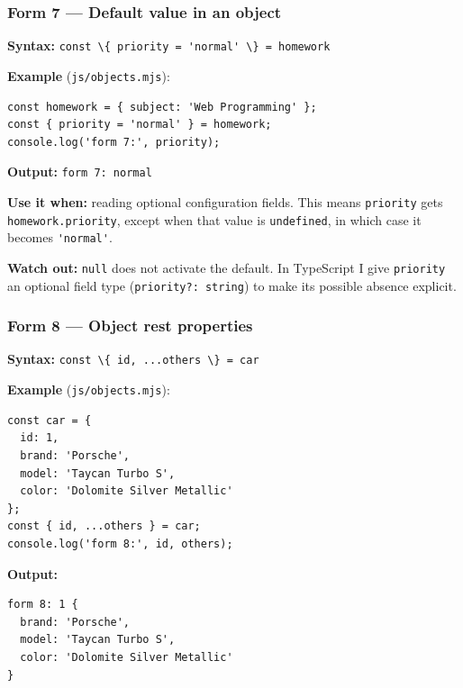 \documentclass[
  9pt,
]{article}
\newcommand{\passthrough}[1]{#1}
\begin{document}
\subsubsection{Form 7 --- Default value in an
object}\label{form-7-default-value-in-an-object}

\textbf{Syntax:}
\passthrough{\lstinline!const \{ priority = 'normal' \} = homework!}

\textbf{Example} (\passthrough{\lstinline!js/objects.mjs!}):

\begin{lstlisting}
const homework = { subject: 'Web Programming' };
const { priority = 'normal' } = homework;
console.log('form 7:', priority);
\end{lstlisting}

\textbf{Output:} \passthrough{\lstinline!form 7: normal!}

\textbf{Use it when:} reading optional configuration fields. This means
\passthrough{\lstinline!priority!} gets
\passthrough{\lstinline!homework.priority!}, except when that value is
\passthrough{\lstinline!undefined!}, in which case it becomes
\passthrough{\lstinline!'normal'!}.

\textbf{Watch out:} \passthrough{\lstinline!null!} does not activate the
default. In TypeScript I give \passthrough{\lstinline!priority!} an
optional field type (\passthrough{\lstinline!priority?: string!}) to
make its possible absence explicit.

\subsubsection{Form 8 --- Object rest
properties}\label{form-8-object-rest-properties}

\textbf{Syntax:}
\passthrough{\lstinline!const \{ id, ...others \} = car!}

\textbf{Example} (\passthrough{\lstinline!js/objects.mjs!}):

\begin{lstlisting}
const car = {
  id: 1,
  brand: 'Porsche',
  model: 'Taycan Turbo S',
  color: 'Dolomite Silver Metallic'
};
const { id, ...others } = car;
console.log('form 8:', id, others);
\end{lstlisting}

\textbf{Output:}

\begin{lstlisting}
form 8: 1 {
  brand: 'Porsche',
  model: 'Taycan Turbo S',
  color: 'Dolomite Silver Metallic'
}
\end{lstlisting}
\end{document}
